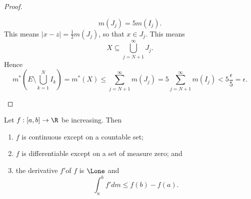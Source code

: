 \documentclass[pmath451]{subfiles}
\begin{document}
\begin{proof}
\begin{claim}
            \begin{equation*}
                m\left( J_j \right) = 5m\left( I_j \right).
            \end{equation*}
            This means $\left| x-z \right| = \frac{1}{2}m\left( J_j \right)$, so that $x\in J_j$. This means
            \begin{equation*}
                X \subseteq \bigcup^{\infty}_{j=N+1} J_j.
            \end{equation*}
            Hence
            \begin{equation*}
                m^{*}\left( E\setminus\bigcup^{N}_{k=1} I_k \right) = m^{*}\left( X \right) \leq \sum^{\infty}_{j=N+1} m\left( J_j \right) = 5 \sum^{\infty}_{j=N+1} m\left( I_j \right) < 5 \frac{\epsilon}{5} = \epsilon.
            \end{equation*}
        \end{claim}
    \end{proof}
    
    \begin{theorem}{}
        Let $f:\left[ a,b \right]\to\R$ be increasing. Then
        \begin{enumerate}
            \item $f$ is continuous except on a countable set;
            \item $f$ is differentiable except on a set of measure zero; and
            \item the derivative $f'$\footnotemark[1] of $f$ is $\Lone$ and
                \begin{equation*}
                    \int^{b}_{a}f'dm \leq f\left( b \right)-f\left( a \right).
                \end{equation*}
        \end{enumerate}
        
        \noindent
        \begin{minipage}{\textwidth}
        \end{minipage}
    \end{theorem}

    \clearpage
    
\end{document}
